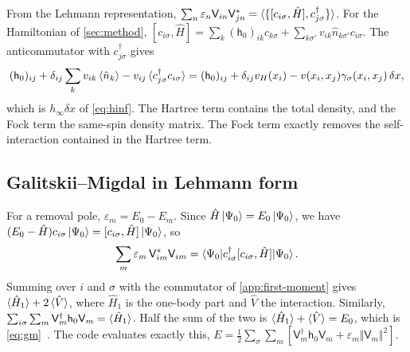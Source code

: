 \documentclass[11pt,a4paper]{article}
\newcommand{\dx}{\delta x}
\newcommand{\mat}[1]{\mathsf{#1}}
\begin{document}
From the Lehmann representation, $\sum_n\varepsilon_n\mat V_{in}\mat V_{jn}^* = \braket{\{[c_{i\sigma},\hat H],c^\dagger_{j\sigma}\}}$. For the Hamiltonian of \cref{sec:method}, $[c_{i\sigma},\hat H] = \sum_k(\mat h_0)_{ik}c_{k\sigma} + \sum_{k\sigma'}v_{ik}\hat n_{k\sigma'}c_{i\sigma}$. The anticommutator with $c^\dagger_{j\sigma}$ gives
\begin{equation}
(\mat h_0)_{ij} + \delta_{ij}\sum_{k}v_{ik}\braket{\hat n_k} - v_{ij}\braket{c^\dagger_{j\sigma}c_{i\sigma}}
= (\mat h_0)_{ij} + \delta_{ij}v_H(x_i) - v(x_i,x_j)\gamma_\sigma(x_i,x_j)\,\dx,
\end{equation}
which is $h_\infty\dx$ of \cref{eq:hinf}. The Hartree term contains the total density, and the Fock term the same-spin density matrix. The Fock term exactly removes the self-interaction contained in the Hartree term.

\subsection{Galitskii--Migdal in Lehmann form}

For a removal pole, $\varepsilon_m = E_0 - E_m$. Since $\hat H\ket{\Psi_0} = E_0\ket{\Psi_0}$, we have $(E_0-\hat H)c_{i\sigma}\ket{\Psi_0} = [c_{i\sigma},\hat H]\ket{\Psi_0}$, so
\begin{equation}
\sum_{m}\varepsilon_m\,\mat V_{im}^*\mat V_{im} = \braket{\Psi_0|c^\dagger_{i\sigma}[c_{i\sigma},\hat H]|\Psi_0}.
\end{equation}
Summing over $i$ and $\sigma$ with the commutator of \cref{app:first-moment} gives $\braket{\hat H_1} + 2\braket{\hat V}$, where $\hat H_1$ is the one-body part and $\hat V$ the interaction. Similarly, $\sum_{i\sigma}\sum_m\mat V_m^\dagger\mat h_0\mat V_m = \braket{\hat H_1}$. Half the sum of the two is $\braket{\hat H_1}+\braket{\hat V} = E_0$, which is \cref{eq:gm}~\cite{galitskii1958,fetter1971}. The code evaluates exactly this, $E = \tfrac12\sum_\sigma\sum_m[\mat V_m^\dagger\mat h_0\mat V_m + \varepsilon_m\Vert\mat V_m\Vert^2]$.



\end{document}
